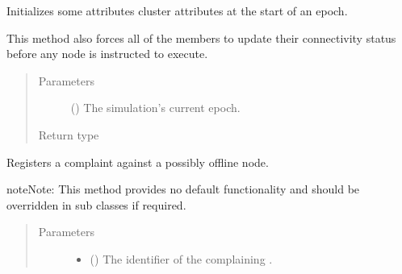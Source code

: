 \documentclass[letterpaper,10pt,english]{sphinxmanual}
\begin{document}
\begin{fulllineitems}

\begin{fulllineitems}
\label{\detokenize{app.domain:app.domain.cluster_groups.Cluster._setup_epoch}}
Initializes some attributes cluster attributes at the start of an
epoch.

This method also forces all of the  members to update
their connectivity status before any node is instructed to execute.
\begin{quote}\begin{description}
\item[{Parameters}] \leavevmode
{} () \textendash{} The simulation’s current epoch.

\item[{Return type}] \leavevmode
{}

\end{description}\end{quote}

\end{fulllineitems}


\begin{fulllineitems}
\label{\detokenize{app.domain:app.domain.cluster_groups.Cluster.complain}}
Registers a complaint against a possibly offline node.

\begin{sphinxadmonition}{note}{Note:}
This method provides no default functionality and should be
overridden in sub classes if required.
\end{sphinxadmonition}
\begin{quote}\begin{description}
\item[{Parameters}] \leavevmode\begin{itemize}
\item {} 
 () \textendash{} The identifier of the complaining {\hyperref[\detokenize{app.domain:app.domain.network_nodes.Node}]{}}.


\end{itemize}
\end{description}
\end{quote}
\end{fulllineitems}
\end{fulllineitems}
\end{document}
